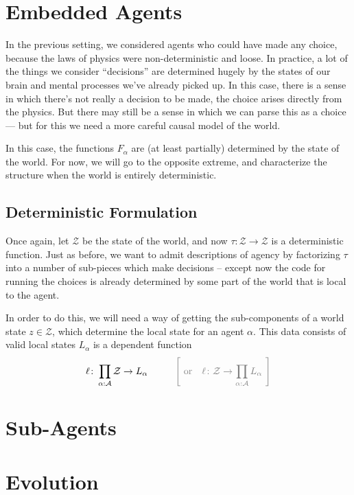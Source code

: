 \documentclass{article}
\theoremstyle{definition}
\newcommand{\Z}{\mathcal Z}
\begin{document}
	

	\section{Embedded Agents} %
	
	In the previous setting, we considered agents who could have made any choice, because the laws of physics were non-deterministic and loose. In practice, a lot of the things we consider ``decisions'' are determined hugely by the states of our brain and mental processes we've already picked up. In this case, there is a sense in which there's not really a decision to be made, the choice arises directly from the physics. But there may still be a sense in which we can parse this as a choice --- but for this we need a more careful causal model of the world.
	
	In this case, the functions $F_\alpha$ are (at least partially) determined by the state of the world. For now, we will go to the opposite extreme, and characterize the structure when the world is entirely deterministic. 
	
	\subsection{Deterministic Formulation}
	Once again, let $\Z$ be the state of the world, and now $\tau\colon \Z \to \Z$ is a deterministic function. Just as before, we want to admit descriptions of agency by factorizing $\tau$ into a number of sub-pieces which make decisions -- except now the code for running the choices is already determined by some part of the world that is local to the agent.
	
	In order to do this, we will need a way of getting the sub-components of a world state $z \in \Z$, which determine the local state for an agent $\alpha$. This data consists of valid local states $L_\alpha$ is a dependent function
	\[ \ell \colon \prod_{\alpha: \cal A}\Z \to L_\alpha \hspace{1cm} {\color{gray}\Bigg[~\text{or}\quad \ell \colon \Z \to \prod_{\alpha: \cal A} L_\alpha~\Bigg] } \]
	
	
	\section{Sub-Agents}
	
	\section{Evolution} %
	
\end{document}
